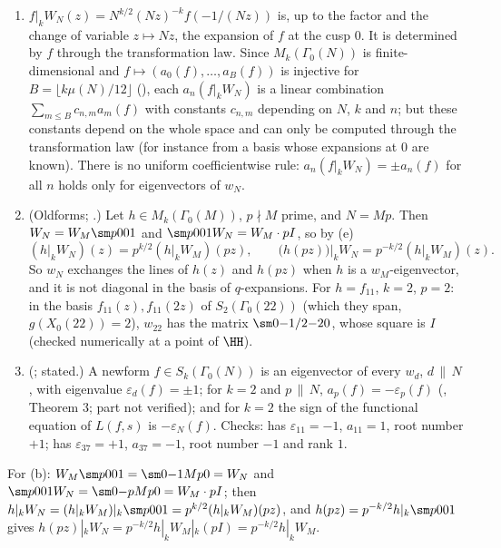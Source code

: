 \begin{example}\label{ex:modforms:atkin-lehner-q-expansions}
\begin{enumerate}[label=(\alph*)]
\item $f|_kW_N(z)=N^{k/2}(Nz)^{-k}f(-1/(Nz))$ is, up to the factor and the change of variable $z\mapsto Nz$, the expansion of $f$ at the cusp $0$. It is determined by $f$ through the
transformation law. Since $M_k(\Gamma_0(N))$ is finite-dimensional and $f\mapsto(a_0(f),\dots,a_B(f))$ is injective for $B=\lfloor k\mu(N)/12\rfloor$ (), each
$a_n(f|_kW_N)$ is a linear combination $\sum_{m\le B}c_{n,m}a_m(f)$ with constants $c_{n,m}$ depending on $N$, $k$ and $n$; but these constants depend on the whole space and can only be
computed through the transformation law (for instance from a basis whose expansions at $0$ are known). There is no uniform coefficientwise rule: $a_n(f|_kW_N)=\pm a_n(f)$ for all $n$ holds
only for eigenvectors of $w_N$.
\item (Oldforms; .) Let $h\in M_k(\Gamma_0(M))$, $p\nmid M$ prime, and $N=Mp$. Then $W_N=W_M\sm p001$ and $\sm p001W_N=W_M\cdot pI$, so by (e)
\[
(h|_kW_N)(z)=p^{k/2}(h|_kW_M)(pz),\qquad\bigl(h(pz)\bigr)\big|_kW_N=p^{-k/2}(h|_kW_M)(z).
\]
So $w_N$ exchanges the lines of $h(z)$ and $h(pz)$ when $h$ is a $w_M$-eigenvector, and it is not diagonal in the basis of $q$-expansions. For $h=f_{11}$, $k=2$, $p=2$: in the basis
$f_{11}(z),f_{11}(2z)$ of $S_2(\Gamma_0(22))$ (which they span, $g(X_0(22))=2$), $w_{22}$ has the matrix $\sm0{-1/2}{-2}0$, whose square is $I$ (checked numerically at a point of $\HH$).
\item (; stated.) A newform $f\in S_k(\Gamma_0(N))$ is an eigenvector of every $w_d$, $d\,\|\,N$, with eigenvalue $\varepsilon_d(f)=\pm1$; for $k=2$ and $p\,\|\,N$,
$a_p(f)=-\varepsilon_p(f)$ (\cite{AtkinLehner70}, Theorem 3; part not verified); and for $k=2$ the sign of the functional equation of $L(f,s)$ is $-\varepsilon_N(f)$. Checks:  has $\varepsilon_{11}=-1$,
$a_{11}=1$, root number $+1$;  has $\varepsilon_{37}=+1$, $a_{37}=-1$, root number $-1$ and rank $1$.
\end{enumerate}
\end{example}

For (b): $W_M\sm p001=\sm0{-1}{Mp}0=W_N$ and $\sm p001W_N=\sm0{-p}{Mp}0=W_M\cdot pI$; then $h|_kW_N=(h|_kW_M)|_k\sm p001=p^{k/2}(h|_kW_M)(pz)$, and $h(pz)=p^{-k/2}h|_k\sm p001$ gives
$h(pz)|_kW_N=p^{-k/2}h|_kW_M|_k(pI)=p^{-k/2}h|_kW_M$.


